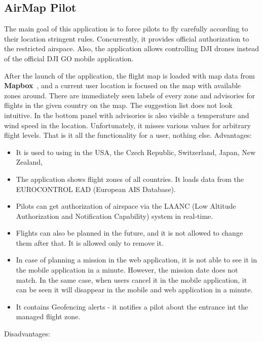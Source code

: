 \subsection{AirMap Pilot}\label{subsec:airmap-pilot}
The main goal of this application is to force pilots to fly carefully according to their location stringent rules.
Concurrently, it provides official authorization to the restricted airspace.
Also, the application allows controlling DJI drones instead of the official DJI GO mobile application.

After the launch of the application, the flight map is loaded with map data from \textbf{Mapbox}~\cite{mapBox}, and a current user location is focused on the map with available zones around.
There are immediately seen labels of every zone and advisories for flights in the given country on the map.
The suggestion list does not look intuitive.
In the bottom panel with advisories is also visible a temperature and wind speed in the location.
Unfortunately, it misses various values for arbitrary flight levels.
That is it all the functionality for a user, nothing else.
\newline
\newline
Advantages:
\begin{itemize}
    \item It is used to using in the USA, the Czech Republic, Switzerland, Japan, New Zealand, \textellipsis
    \item The application shows flight zones of all countries.
    It loads data from the EUROCONTROL EAD (European AIS Database).~\cite{eurocontrol}
    \item Pilots can get authorization of airspace via the LAANC (Low Altitude Authorization and Notification Capability) system in real-time.
    \item Flights can also be planned in the future, and it is not allowed to change them after that.
    It is allowed only to remove it.
    \item In case of planning a mission in the web application, it is not able to see it in the mobile application in a minute.
    However, the mission date does not match.
    In the same case, when users cancel it in the mobile application, it can be seen it will disappear in the mobile and web application in a minute.
    \item It contains Geofencing alerts - it notifies a pilot about the entrance int the managed flight zone.
\end{itemize}
Disadvantages:
